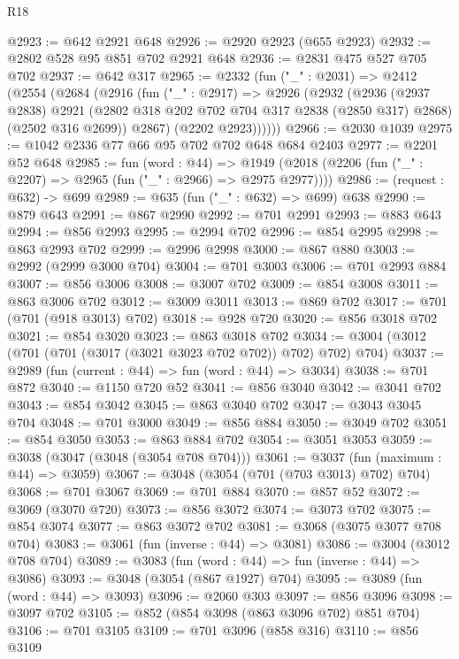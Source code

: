 \begin{lexlean}{R18}
\begin{coremodule}
@2923 := @642 @2921 @648
@2926 := @2920 @2923 (@655 @2923)
@2932 := @2802 @528 @95 @851 @702 @2921 @648
@2936 := @2831 @475 @527 @705 @702
@2937 := @642 @317
@2965 := @2332
    (fun ("_" : @2031) =>
    @2412
      (@2554
        (@2684
          (@2916
            (fun ("_" : @2917) =>
            @2926
              (@2932
                (@2936
                  (@2937 @2838)
                  @2921
                  (@2802 @318 @202 @702 @704 @317 @2838 (@2850 @317) @2868)
                  (@2502 @316 @2699))
                @2867)
              (@2202 @2923))))))
@2966 := @2030 @1039
@2975 := @1042 @2336 @77 @66 @95 @702 @702 @648 @684 @2403
@2977 := @2201 @52 @648
@2985 := fun (word : @44) =>
  @1949 (@2018 (@2206 (fun ("_" : @2207) => @2965 (fun ("_" : @2966) => @2975 @2977))))
@2986 := (request : @632) -> @699
@2989 := @635 (fun ("_" : @632) => @699) @638
@2990 := @879 @643
@2991 := @867 @2990
@2992 := @701 @2991
@2993 := @883 @643
@2994 := @856 @2993
@2995 := @2994 @702
@2996 := @854 @2995
@2998 := @863 @2993 @702
@2999 := @2996 @2998
@3000 := @867 @880
@3003 := @2992 (@2999 @3000 @704)
@3004 := @701 @3003
@3006 := @701 @2993 @884
@3007 := @856 @3006
@3008 := @3007 @702
@3009 := @854 @3008
@3011 := @863 @3006 @702
@3012 := @3009 @3011
@3013 := @869 @702
@3017 := @701 (@701 (@918 @3013) @702)
@3018 := @928 @720
@3020 := @856 @3018 @702
@3021 := @854 @3020
@3023 := @863 @3018 @702
@3034 := @3004 (@3012 (@701 (@701 (@3017 (@3021 @3023 @702 @702)) @702) @702) @704)
@3037 := @2989 (fun (current : @44) => fun (word : @44) => @3034)
@3038 := @701 @872
@3040 := @1150 @720 @52
@3041 := @856 @3040
@3042 := @3041 @702
@3043 := @854 @3042
@3045 := @863 @3040 @702
@3047 := @3043 @3045 @704
@3048 := @701 @3000
@3049 := @856 @884
@3050 := @3049 @702
@3051 := @854 @3050
@3053 := @863 @884 @702
@3054 := @3051 @3053
@3059 := @3038 (@3047 (@3048 (@3054 @708 @704)))
@3061 := @3037 (fun (maximum : @44) => @3059)
@3067 := @3048 (@3054 (@701 (@703 @3013) @702) @704)
@3068 := @701 @3067
@3069 := @701 @884
@3070 := @857 @52
@3072 := @3069 (@3070 @720)
@3073 := @856 @3072
@3074 := @3073 @702
@3075 := @854 @3074
@3077 := @863 @3072 @702
@3081 := @3068 (@3075 @3077 @708 @704)
@3083 := @3061 (fun (inverse : @44) => @3081)
@3086 := @3004 (@3012 @708 @704)
@3089 := @3083 (fun (word : @44) => fun (inverse : @44) => @3086)
@3093 := @3048 (@3054 (@867 @1927) @704)
@3095 := @3089 (fun (word : @44) => @3093)
@3096 := @2060 @303
@3097 := @856 @3096
@3098 := @3097 @702
@3105 := @852 (@854 @3098 (@863 @3096 @702) @851 @704)
@3106 := @701 @3105
@3109 := @701 @3096 (@858 @316)
@3110 := @856 @3109

\end{coremodule}
\end{lexlean}
